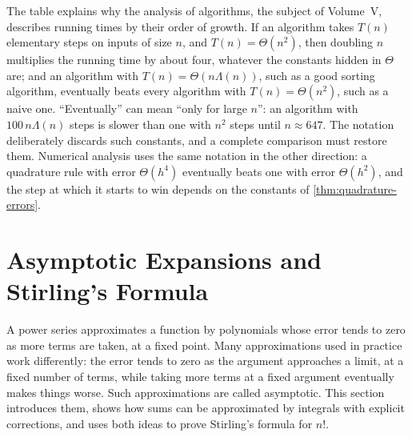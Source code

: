 \begin{table}
\end{table}

The table explains why the analysis of algorithms, the subject of Volume~V, describes running times by their order of growth. If an algorithm takes $T(n)$ elementary steps on inputs of size $n$, and $T(n)=\Theta(n^2)$, then doubling $n$ multiplies the running time by about four, whatever the constants hidden in $\Theta$ are; and an algorithm with $T(n)=\Theta(n\Lambda(n))$, such as a good sorting algorithm, eventually beats every algorithm with $T(n)=\Theta(n^2)$, such as a naive one. ``Eventually'' can mean ``only for large $n$'': an algorithm with $100\,n\Lambda(n)$ steps is slower than one with $n^2$ steps until $n\approx647$. The notation deliberately discards such constants, and a complete comparison must restore them. Numerical analysis uses the same notation in the other direction: a quadrature rule with error $\Theta(h^4)$ eventually beats one with error $\Theta(h^2)$, and the step at which it starts to win depends on the constants of \cref{thm:quadrature-errors}.

\section{Asymptotic Expansions and Stirling's Formula}
\label{sec:asymptotic-expansions}

A power series approximates a function by polynomials whose error tends to zero as more terms are taken, at a fixed point. Many approximations used in practice work differently: the error tends to zero as the argument approaches a limit, at a fixed number of terms, while taking more terms at a fixed argument eventually makes things worse. Such approximations are called asymptotic. This section introduces them, shows how sums can be approximated by integrals with explicit corrections, and uses both ideas to prove Stirling's formula for $n!$.

